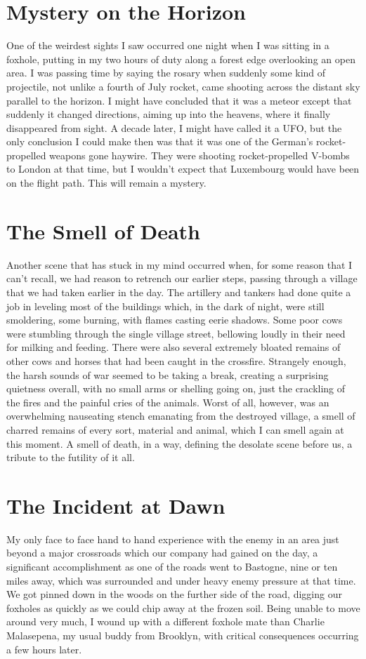 \documentclass[../m3y]{subfiles}
\begin{document}
\section{Mystery on the Horizon}
One of the weirdest sights I saw occurred one night when I was sitting in a foxhole, putting in my two hours of duty along a forest edge overlooking an open area. I was passing time by saying the rosary when suddenly some kind of projectile, not unlike a fourth of July rocket, came shooting across the distant sky parallel to the horizon. I might have concluded that it was a meteor except that suddenly it changed directions, aiming up into the heavens, where it finally disappeared from sight. A decade later, I might have called it a UFO, but the only conclusion I could make then was that it was one of the German's rocket-propelled weapons gone haywire. They were shooting rocket-propelled V-bombs to London at that time, but I wouldn't expect that Luxembourg would have been on the flight path. This will remain a mystery.

\section{The Smell of Death}
Another scene that has stuck in my mind occurred when, for some reason that I can't recall, we had reason to retrench our earlier steps, passing through a village that we had taken earlier in the day. The artillery and tankers had done quite a job in leveling most of the buildings which, in the dark of night, were still smoldering, some burning, with flames casting eerie shadows. Some poor cows were stumbling through the single village street, bellowing loudly in their need for milking and feeding. There were also several extremely bloated remains of other cows and horses that had been caught in the crossfire. Strangely enough, the harsh sounds of war seemed to be taking a break, creating a surprising quietness overall, with no small arms or shelling going on, just the crackling of the fires and the painful cries of the animals. Worst of all, however, was an overwhelming nauseating stench emanating from the destroyed village, a smell of charred remains of every sort, material and animal, which I can smell again at this moment. A smell of death, in a way, defining the desolate scene before us, a tribute to the futility of it all.

\section{The Incident at Dawn}
My only face to face hand to hand experience with the enemy in an area just beyond a major crossroads which our company had gained on the day, a significant accomplishment as one of the roads went to Bastogne, nine or ten miles away, which was surrounded and under heavy enemy pressure at that time. We got pinned down in the woods on the further side of the road, digging our foxholes as quickly as we could chip away at the frozen soil. Being unable to move around very much, I wound up with a different foxhole mate than Charlie Malasepena, my usual buddy from Brooklyn, with critical consequences occurring a few hours later.
\end{document}
